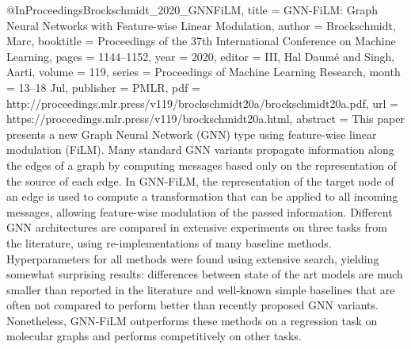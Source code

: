 {{%

@InProceedings{Brockschmidt_2020_GNNFiLM,
  title = {{{GNN}-{F}i{LM}: Graph Neural Networks with Feature-wise Linear Modulation}},
  author =  {Brockschmidt, Marc},
  booktitle = {Proceedings of the 37th International Conference on Machine Learning},
  pages = {1144--1152},
  year = 	 {2020},
  editor = {III, Hal Daumé and Singh, Aarti},
  volume = 	 {119},
  series = 	 {Proceedings of Machine Learning Research},
  month = 	 {13--18 Jul},
  publisher =    {PMLR},
  pdf = 	 {http://proceedings.mlr.press/v119/brockschmidt20a/brockschmidt20a.pdf},
  url = 	 {https://proceedings.mlr.press/v119/brockschmidt20a.html},
  abstract = 	 {This paper presents a new Graph Neural Network (GNN) type using feature-wise linear modulation (FiLM). Many standard GNN variants propagate information along the edges of a graph by computing messages based only on the representation of the source of each edge. In GNN-FiLM, the representation of the target node of an edge is used to compute a transformation that can be applied to all incoming messages, allowing feature-wise modulation of the passed information. Different GNN architectures are compared in extensive experiments on three tasks from the literature, using re-implementations of many baseline methods. Hyperparameters for all methods were found using extensive search, yielding somewhat surprising results: differences between state of the art models are much smaller than reported in the literature and well-known simple baselines that are often not compared to perform better than recently proposed GNN variants. Nonetheless, GNN-FiLM outperforms these methods on a regression task on molecular graphs and performs competitively on other tasks.}
}

}}
